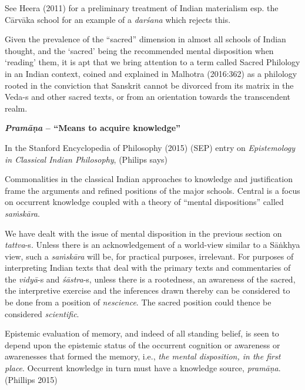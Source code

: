 See Heera (2011) for a preliminary treatment of Indian materialism esp. the Cārvāka school for an example of a {\sl darśana} which rejects this.

Given the prevalence of the ``sacred'' dimension in almost all schools of Indian thought, and the `sacred' being the recommended mental disposition when `reading' them, it is apt that  we bring attention to a term called Sacred Philology in an Indian context, coined and explained in Malhotra  (2016:362) as a philology rooted in the conviction that Sanskrit cannot be divorced from its matrix in the Veda-s and other sacred texts, or from an orientation towards the transcendent realm.

{\bf {\sl\bfseries Pramāṇa}  -- ``Means to acquire knowledge''}

In the Stanford Encyclopedia of Philosophy (2015) (SEP) entry on {\sl Epistemology in Classical Indian Philosophy}, (Philips says)
\begin{myquote}
Commonalities in the classical Indian approaches to knowledge and justification frame the arguments and refined positions of the major schools. Central is a focus on occurrent knowledge coupled with a theory of ``mental dispositions'' called {\sl saṁskāra}.
\end{myquote}

We have dealt with the issue of mental disposition in the previous section on {\sl tattva}-s. Unless there is an acknowledgement of a world-view similar to a Sāṅkhya view, such a {\sl saṁskāra} will be, for practical purposes, irrelevant. For purposes of interpreting Indian texts that deal with the primary texts and commentaries of the {\sl vidyā}-s and {\sl śāstra}-s, unless there is a rootedness, an awareness of the sacred, the interpretive exercise and the inferences drawn thereby can be considered to be done from a position of {\sl nescience}. The sacred position could thence be considered {\sl scientific}.
\begin{myquote}
Epistemic evaluation of memory, and indeed of all standing belief, is seen to depend upon the epistemic status of the occurrent cognition or awareness or awarenesses that formed the memory, i.e., {\sl the mental disposition, in the first place}. Occurrent knowledge in turn must have a knowledge source, {\sl pramāṇa}.\hfill (Phillips 2015)
\end{myquote}

